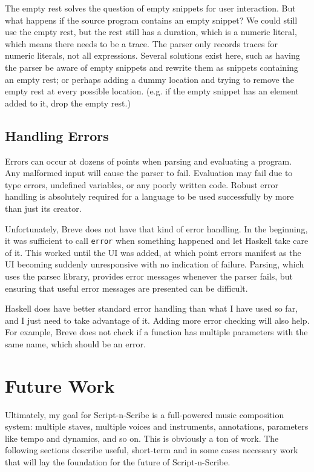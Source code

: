 \documentclass[nocopyrightspace,numbers,10pt]{sigplanconf}
\newcommand{\sns}{Script-n-Scribe}
\begin{document}
The empty rest solves the question of empty snippets for user interaction. But
what happens if the source program contains an empty snippet? We could still use
the empty rest, but the rest still has a duration, which is a numeric literal,
which means there needs to be a trace. The parser only records traces for
numeric literals, not all expressions. Several solutions exist here, such as
having the parser be aware of empty snippets and rewrite them as snippets
containing an empty rest; or perhaps adding a dummy location and trying to
remove the empty rest at every possible location. (e.g. if the empty snippet has
an element added to it, drop the empty rest.)

\subsection{Handling Errors}

Errors can occur at dozens of points when parsing and evaluating a program. Any
malformed input will cause the parser to fail. Evaluation may fail due to type
errors, undefined variables, or any poorly written code. Robust error handling
is absolutely required for a language to be used successfully by more than just
its creator.

Unfortunately, Breve does not have that kind of error handling. In the
beginning, it was sufficient to call \texttt{error} when something happened
and let Haskell take care of it. This worked until the UI was added, at which
point errors manifest as the UI becoming suddenly unresponsive with no
indication of failure. Parsing, which uses the parsec library, provides error
messages whenever the parser fails, but ensuring that useful error messages are
presented can be difficult.

Haskell does have better standard error handling than what I have used so far,
and I just need to take advantage of it. Adding more error checking will also
help.  For example, Breve does not check if a function has multiple parameters
with the same name, which should be an error.

\section{Future Work}
\label{sec:future}

Ultimately, my goal for \sns{} is a full-powered music composition system:
multiple staves, multiple voices and instruments, annotations, parameters like
tempo and dynamics, and so on. This is obviously a ton of work. The following
sections describe useful, short-term and in some cases necessary work that will
lay the foundation for the future of \sns.
\end{document}
